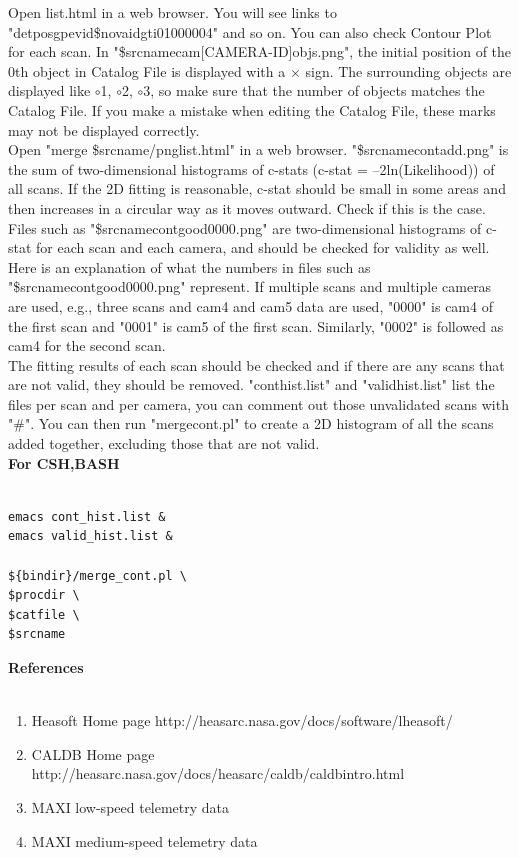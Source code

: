 \documentclass[10pt]{report}
\renewcommand{\_}{\textscale{.5}{\textbf{\textunderscore}}}
\begin{document}
Open list.html in a web browser. You will see links to "detpos\_gpev\_id\${novaid}\_gti01\_0000\_04" and so on. You can also check Contour Plot for each scan. In "\$srcname\_cam[CAMERA-ID]\_objs.png", the initial position of the 0th object in Catalog File is displayed with a $\times$ sign. The surrounding objects are displayed like $\circ$1, $\circ$2, $\circ$3, so make sure that the number of objects matches the Catalog File. If you make a mistake when editing the Catalog File, these marks may not be displayed correctly. \\
\indent Open "merge \${srcname}/pnglist.html" in a web browser. "\${srcname}\_cont\_add.png" is the sum of two-dimensional histograms of c-stats (c-stat = --2ln(Likelihood)) of all scans. If the 2D fitting is reasonable, c-stat should be small in some areas and then increases in a circular way as it moves outward. Check if this is the case. Files such as "\${srcname}\_cont\_good\_0000.png" are two-dimensional histograms of c-stat for each scan and each camera, and should be checked for validity as well. Here is an explanation of what the numbers in files such as "\${srcname}\_cont\_good\_0000.png" represent. If multiple scans and multiple cameras are used, e.g., three scans and cam4 and cam5 data are used, "0000" is cam4 of the first scan and "0001" is cam5 of the first scan. Similarly, "0002" is followed as cam4 for the second scan.\\
\indent The fitting results of each scan should be checked and if there are any scans that are not valid, they should be removed. "cont\_hist.list" and "valid\_hist.list" list the files per scan and per camera, you can comment out those unvalidated scans with "\#". You can then run "merge\_cont.pl" to create a 2D histogram of all the scans added together, excluding those that are not valid. \\

\noindent\textbf{For CSH,BASH} \\

\begin{lstlisting}[frame=single]

emacs cont_hist.list &
emacs valid_hist.list &

${bindir}/merge_cont.pl \
$procdir \
$catfile \
$srcname

\end{lstlisting}

\clearpage

\noindent\normalfont\huge\textbf{References} \\

\

\normalsize \begin{enumerate}
  \item Heasoft Home page http://heasarc.nasa.gov/docs/software/lheasoft/
  \item CALDB Home page http://heasarc.nasa.gov/docs/heasarc/caldb/caldb\_intro.html
  \item MAXI low-speed telemetry data
  \item MAXI medium-speed telemetry data
\end{enumerate}
\end{document}
